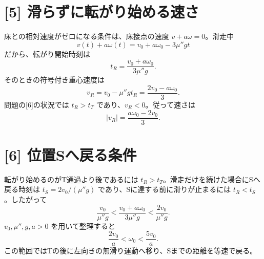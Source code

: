 \documentclass[11pt,a4paper]{article}
\begin{document}
\section*{[5] 滑らずに転がり始める速さ}
床との相対速度がゼロになる条件は、床接点の速度 $v+a\omega=0$。滑走中
\begin{equation}
  v(t)+a\omega(t)=v_0+a\omega_0-3\mu''gt
\end{equation}
だから、転がり開始時刻は
\begin{equation}
  t_R=\frac{v_0+a\omega_0}{3\mu''g}.
\end{equation}
そのときの符号付き重心速度は
\begin{equation}
  v_R=v_0-\mu''gt_R=\frac{2v_0-a\omega_0}{3}.
\end{equation}
問題の[6]の状況では $t_R>t_T$ であり、$v_R<0$。従って速さは
\begin{equation}
  \boxed{|v_R|=\frac{a\omega_0-2v_0}{3}}.
\end{equation}

\section*{[6] 位置Sへ戻る条件}
転がり始めるのがT通過より後であるには $t_R>t_T$。滑走だけを続けた場合にSへ戻る時刻は $t_S=2v_0/(\mu''g)$ であり、Sに達する前に滑りが止まるには $t_R<t_S$。したがって
\begin{equation}
  \frac{v_0}{\mu''g}<\frac{v_0+a\omega_0}{3\mu''g}
   <\frac{2v_0}{\mu''g}.
\end{equation}
$v_0,\mu'',g,a>0$ を用いて整理すると
\begin{equation}
  \boxed{\frac{2v_0}{a}<\omega_0<\frac{5v_0}{a}}.
\end{equation}
この範囲ではTの後に左向きの無滑り運動へ移り、Sまでの距離を等速で戻る。
\end{document}
